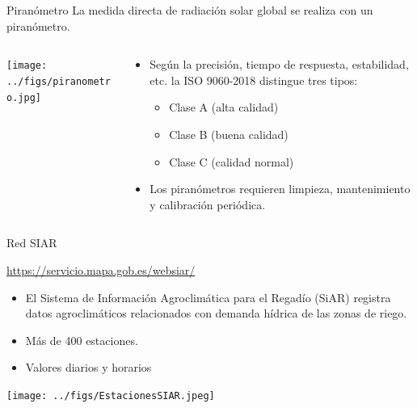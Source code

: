 \documentclass[aspectratio=169, usenames,svgnames,dvipsnames]{beamer}
\begin{document}
\begin{frame}[label={sec:orga707d74}]{Piranómetro}
La medida directa de radiación solar global se realiza con un piranómetro.
\begin{columns}
\begin{column}{0.4\columnwidth}
\begin{center}
\begin{center}
\texttt{[image: ../figs/piranometro.jpg]}
\end{center}
\end{center}
\end{column}
\begin{column}{0.6\columnwidth}
\begin{itemize}
\item Según la precisión, tiempo de respuesta, estabilidad, etc. la ISO 9060-2018 distingue tres tipos:
\begin{itemize}
\item Clase A (alta calidad)
\item Clase B (buena calidad)
\item Clase C (calidad normal)
\end{itemize}
\item Los piranómetros requieren limpieza, mantenimiento y calibración periódica.
\end{itemize}
\end{column}
\end{columns}
\end{frame}
\begin{frame}[label={sec:org189903a}]{Red SIAR}
\begin{block}{\url{https://servicio.mapa.gob.es/websiar/}}
\begin{itemize}
\item El Sistema de Información Agroclimática para el Regadío (SiAR)
registra datos agroclimáticos relacionados con demanda hídrica de
las zonas de riego.

\item Más de 400 estaciones.

\item Valores diarios y horarios
\end{itemize}

\begin{center}
\begin{center}
\texttt{[image: ../figs/EstacionesSIAR.jpeg]}
\end{center}
\end{center}
\end{block}
\end{frame}
\end{document}
